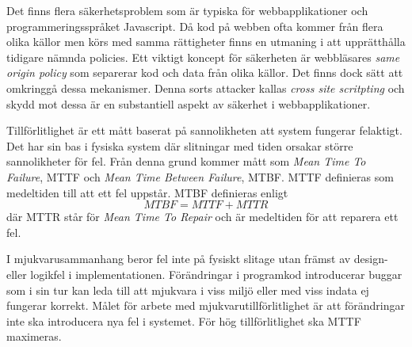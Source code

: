 Det finns flera säkerhetsproblem som är typiska för webbapplikationer och programmeringsspråket Javascript. Då kod på webben ofta kommer från flera olika källor men körs med samma rättigheter finns en utmaning i att upprätthålla tidigare nämnda policies. Ett viktigt koncept för säkerheten är webbläsares \textit{same origin policy} som separerar kod och data från olika källor. Det finns dock sätt att omkringgå dessa mekanismer.\cite{Hejderup2017} Denna sorts attacker kallas \textit{cross site scritpting} och skydd mot dessa är en substantiell aspekt av säkerhet i webbapplikationer.

Tillförlitlighet är ett mått baserat på sannolikheten att system fungerar felaktigt. Det har sin bas i fysiska system där slitningar med tiden orsakar större sannolikheter för fel. Från denna grund kommer mått som \textit{Mean Time To Failure}, MTTF och \textit{Mean Time Between Failure}, MTBF. MTTF definieras som medeltiden till att ett fel uppstår. MTBF definieras enligt $$MTBF = MTTF + MTTR$$ där MTTR står för \textit{Mean Time To Repair} och är medeltiden för att reparera ett fel.\cite{software-metrics}

I mjukvarusammanhang beror fel inte på fysiskt slitage utan främst av design- eller logikfel i implementationen. Förändringar i programkod introducerar buggar som i sin tur kan leda till att mjukvara i viss miljö eller med viss indata ej fungerar korrekt. Målet för arbete med mjukvarutillförlitlighet är att förändringar inte ska introducera nya fel i systemet.\cite{software-metrics} För hög tillförlitlighet ska MTTF maximeras.
